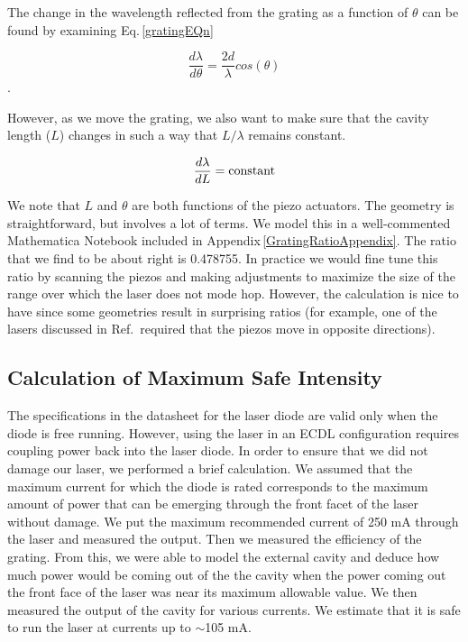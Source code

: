 The change in the wavelength reflected from the grating as a function of $\theta$ can be found by examining Eq.\,\ref{gratingEQn}

\begin{equation}
    \frac{d\lambda}{d \theta}= \frac{2d}{\lambda} cos(\theta)
\end{equation}.

However, as we move the grating, we also want to make sure that the cavity length ($L$) changes in such a way that $L/\lambda$ remains constant. 

\begin{equation}
    \frac{d \lambda}{d L}= \textnormal{constant} 
\end{equation}

We note that $L$ and $\theta$ are both functions of the piezo actuators. The geometry is straightforward, but involves a lot of terms. We model this in a well-commented Mathematica Notebook included in Appendix\,\ref{GratingRatioAppendix}. The ratio that we find to be about right is 0.478755. In practice we would fine tune this ratio by scanning the piezos and making adjustments to maximize the size of the range over which the laser does not mode hop. However, the calculation is nice to have since some geometries result in surprising ratios (for example, one of the lasers discussed in Ref.\,\cite{cjeDiss} required that the piezos move in opposite directions).


\subsection{Calculation of Maximum Safe Intensity}

The specifications in the datasheet for the laser diode are valid only when the diode is free running. However, using the laser in an ECDL configuration requires coupling power back into the laser diode. In order to ensure that we did not damage our laser, we performed a brief calculation. We assumed that the maximum current for which the diode is rated corresponds to the maximum amount of power that can be emerging through the front facet of the laser without damage. We put the maximum recommended current of 250 mA through the laser and measured the output. Then we measured the efficiency of the grating. From this, we were able to model the external cavity and deduce how much power would be coming out of the the cavity when the power coming out the front face of the laser was near its maximum allowable value. We then measured the output of the cavity for various currents. We estimate that it is safe to run the laser at currents up to $\sim$105 mA. 

 





